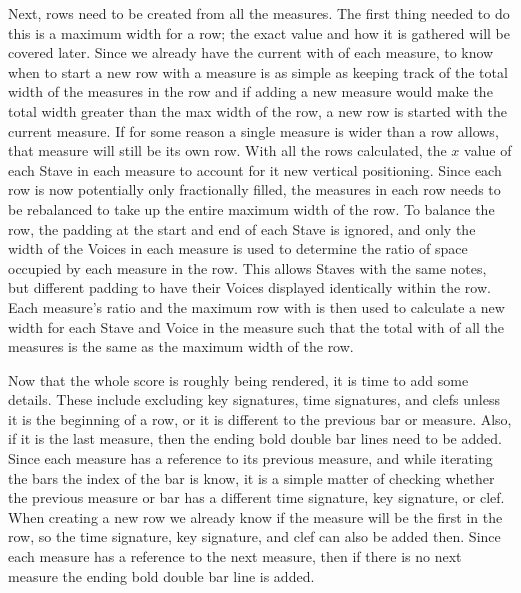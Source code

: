 \documentclass[letterpaper,12pt]{article}
\begin{document}
Next, rows need to be created from all the measures. The first thing needed to do this is a maximum width for a row; the
exact value and how it is gathered will be covered later. Since we already have the current with of each measure, to
know when to start a new row with a measure is as simple as keeping track of the total width of the measures in the row
and if adding a new measure would make the total width greater than the max width of the row, a new row is started with
the current measure. If for some reason a single measure is wider than a row allows, that measure will still be its own
row. With all the rows calculated, the $ x $ value of each Stave in each measure to account for it new vertical
positioning. Since each row is now potentially only fractionally filled, the measures in each row needs to be rebalanced
to take up the entire maximum width of the row. To balance the row, the padding at the start and end of each Stave is
ignored, and only the width of the Voices in each measure is used to determine the ratio of space occupied by each
measure in the row. This allows Staves with the same notes, but different padding to have their Voices displayed
identically within the row. Each measure's ratio and the maximum row with is then used to calculate a new width for each
Stave and Voice in the measure such that the total with of all the measures is the same as the maximum width of the row.

Now that the whole score is roughly being rendered, it is time to add some details. These include excluding key
signatures, time signatures, and clefs unless it is the beginning of a row, or it is different to the previous bar or
measure. Also, if it is the last measure, then the ending bold double bar lines need to be added. Since each measure has a
reference to its previous measure, and while iterating the bars the index of the bar is know, it is a simple
matter of checking whether the previous measure or bar has a different time signature, key signature, or clef. When
creating a new row we already know if the measure will be the first in the row, so the time signature, key signature,
and clef can also be added then. Since each measure has a reference to the next measure, then if there is no next
measure the ending bold double bar line is added.
\end{document}
